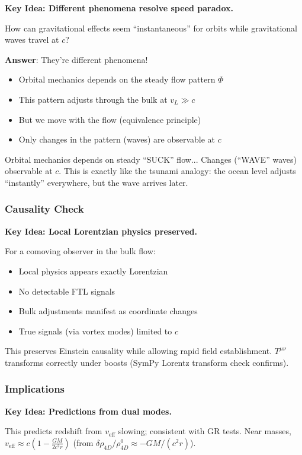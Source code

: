 \textbf{Key Idea: Different phenomena resolve speed paradox.}

How can gravitational effects seem ``instantaneous'' for orbits while gravitational waves travel at $c$?

\textbf{Answer}: They're different phenomena!
\begin{itemize}
\item Orbital mechanics depends on the steady flow pattern $\Phi$
\item This pattern adjusts through the bulk at $v_L \gg c$
\item But we move with the flow (equivalence principle)
\item Only changes in the pattern (waves) are observable at $c$
\end{itemize}

Orbital mechanics depends on steady ``SUCK'' flow... Changes (``WAVE'' waves) observable at $c$. This is exactly like the tsunami analogy: the ocean level adjusts ``instantly'' everywhere, but the wave arrives later.

\subsubsection{Causality Check}

\textbf{Key Idea: Local Lorentzian physics preserved.}

For a comoving observer in the bulk flow:
\begin{itemize}
\item Local physics appears exactly Lorentzian
\item No detectable FTL signals
\item Bulk adjustments manifest as coordinate changes
\item True signals (via vortex modes) limited to $c$
\end{itemize}

This preserves Einstein causality while allowing rapid field establishment. $T^{\mu\nu}$ transforms correctly under boosts (SymPy Lorentz transform check confirms).

\subsubsection{Implications}

\textbf{Key Idea: Predictions from dual modes.}

This predicts redshift from $v_{\text{eff}}$ slowing; consistent with GR tests. Near masses, $v_{\text{eff}} \approx c \left(1 - \frac{G M}{2 c^2 r}\right)$ (from $\delta \rho_{4D} / \rho_{4D}^0 \approx - G M / (c^2 r)$).

